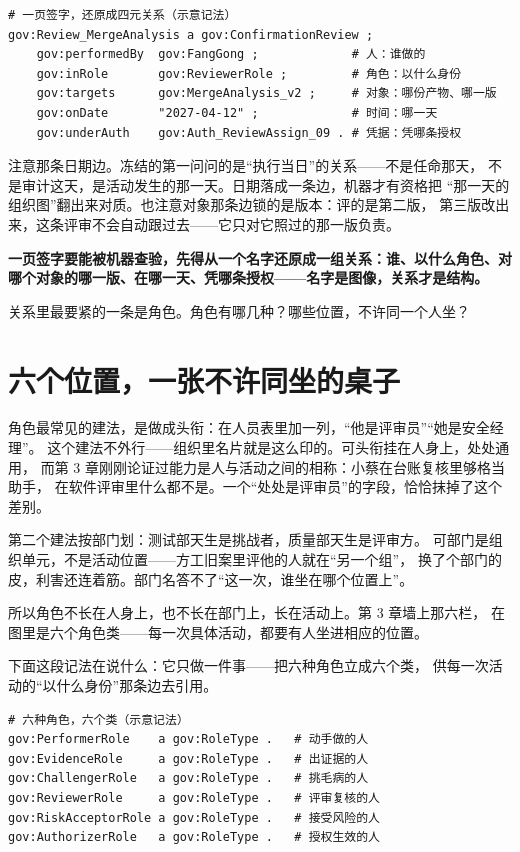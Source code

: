 \nopagebreak[4]
\begin{codebox}
\begin{Verbatim}[fontsize=\small,breaklines=true,breakanywhere=true,breaksymbolleft={},breaksymbolright={}]
# 一页签字，还原成四元关系（示意记法）
gov:Review_MergeAnalysis a gov:ConfirmationReview ;
    gov:performedBy  gov:FangGong ;             # 人：谁做的
    gov:inRole       gov:ReviewerRole ;         # 角色：以什么身份
    gov:targets      gov:MergeAnalysis_v2 ;     # 对象：哪份产物、哪一版
    gov:onDate       "2027-04-12" ;             # 时间：哪一天
    gov:underAuth    gov:Auth_ReviewAssign_09 . # 凭据：凭哪条授权
\end{Verbatim}
\end{codebox}

注意那条日期边。冻结的第一问问的是“执行当日”的关系——不是任命那天，
不是审计这天，是活动发生的那一天。日期落成一条边，机器才有资格把
“那一天的组织图”翻出来对质。也注意对象那条边锁的是版本：评的是第二版，
第三版改出来，这条评审不会自动跟过去——它只对它照过的那一版负责。

\textbf{一页签字要能被机器查验，先得从一个名字还原成一组关系：谁、以什么角色、对哪个对象的哪一版、在哪一天、凭哪条授权——名字是图像，关系才是结构。}

关系里最要紧的一条是角色。角色有哪几种？哪些位置，不许同一个人坐？

\section{六个位置，一张不许同坐的桌子}

角色最常见的建法，是做成头衔：在人员表里加一列，“他是评审员”“她是安全经理”。
这个建法不外行——组织里名片就是这么印的。可头衔挂在人身上，处处通用，
而第 3 章刚刚论证过能力是人与活动之间的相称：小蔡在台账复核里够格当助手，
在软件评审里什么都不是。一个“处处是评审员”的字段，恰恰抹掉了这个差别。

第二个建法按部门划：测试部天生是挑战者，质量部天生是评审方。
可部门是组织单元，不是活动位置——方工旧案里评他的人就在“另一个组”，
换了个部门的皮，利害还连着筋。部门名答不了“这一次，谁坐在哪个位置上”。

所以角色不长在人身上，也不长在部门上，长在活动上。第 3 章墙上那六栏，
在图里是六个角色类——每一次具体活动，都要有人坐进相应的位置。

下面这段记法在说什么：它只做一件事——把六种角色立成六个类，
供每一次活动的“以什么身份”那条边去引用。

\nopagebreak[4]
\begin{codebox}
\begin{Verbatim}[fontsize=\small,breaklines=true,breakanywhere=true,breaksymbolleft={},breaksymbolright={}]
# 六种角色，六个类（示意记法）
gov:PerformerRole    a gov:RoleType .   # 动手做的人
gov:EvidenceRole     a gov:RoleType .   # 出证据的人
gov:ChallengerRole   a gov:RoleType .   # 挑毛病的人
gov:ReviewerRole     a gov:RoleType .   # 评审复核的人
gov:RiskAcceptorRole a gov:RoleType .   # 接受风险的人
gov:AuthorizerRole   a gov:RoleType .   # 授权生效的人
\end{Verbatim}
\end{codebox}

